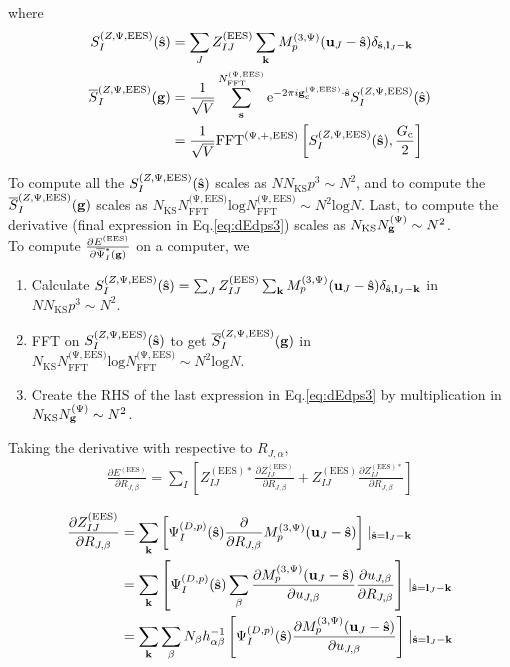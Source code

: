 \documentclass[paper=a4, fontsize=11pt]{article} %
\numberwithin{equation}{section} %
\numberwithin{figure}{section} %
\numberwithin{table}{section} %
\newcommand{\p}{\partial}
\newcommand{\ol}{\overline}
\newcommand{\bu}{{\bf{u}}}
\newcommand{\bl}{{\bf{l}}}
\newcommand{\bk}{{\bf{k}}}
\newcommand{\bs}{{\bf{s}}}
\newcommand{\bg}{{\bf{g}}}
\newcommand{\hs}{{\hat{\bf{s}}}}
\newcommand{\rEES}{{\mathrm{EES}}}
\newcommand{\re}{{\mathrm{e}}}
\newcommand{\rl}{{\mathrm{log}}}
\newcommand{\gcpEES}{{\bg_c^{(\Psi,\rEES)}}}
\newcommand{\al}{{\alpha}}
\newcommand{\sigsc}{{\overline \Psi_I^{*}(\bg)}}
\newcommand{\RJa}{{R_{J,\alpha}}}
\newcommand{\RJb}{{R_{J,\beta}}}
\newcommand{\NFFTpEES}{{N^{\mathrm{(\Psi,\rEES})}_{\mathrm{FFT}}}}
\newcommand{\NgKS}{{N^{\mathrm{(\Psi})}_\bg}}
\newcommand{\hGc}{{\frac{G_{\mathrm{c}}}{2}}}
\newcommand{\Mp}{{M_p^{(3,\Psi)}}}
\newcommand{\FFTpEES}{{\mathrm{FFT}^{(\Psi,+,\rEES)}}}
\begin{document}
where
\begin{equation}
\begin{split}
S^{(Z,\Psi,\rEES)}_I(\hat \bs) &= \sum_J Z_{IJ} ^{(\rEES)} \sum_{\bk} \Mp(\bu_{J}-\hat \bs) \delta_{\hat \bs,\bl_J-\bk}\\
\ol S^{(Z,\Psi,\rEES)}_I(\bg) &= \frac{1}{\sqrt{V}}\sum_{\bs}^\NFFTpEES \re^{-2\pi i\gcpEES \cdot \hat\bs} S^{(Z,\Psi,\rEES)}_I(\hat \bs) \\
&= \frac{1}{\sqrt{V}}\FFTpEES \left[ S^{(Z,\Psi,\rEES)}_I(\hat \bs),\hGc\right]
\end{split}
\end{equation}

To compute all the $S^{(Z,\Psi,\rEES)}_I(\hs)$ scales as $NN_{\mathrm{KS}}p^3 \sim N^2$, and to compute the $\ol S^{(Z,\Psi,\rEES)}_I(\bg)$ scales as $N_{\mathrm{KS}}\NFFTpEES\rl \NFFTpEES\sim N^2 \rl N$. Last, to compute the derivative (final expression in Eq.\eqref{eq:dEdps3}) scales as $N_{\mathrm{KS}}\NgKS \sim N^2$. \\

To compute $\frac{\p E^{(\rEES)}}{\p \sigsc}$ on a computer, we
\begin{enumerate}
\item Calculate $S^{(Z,\Psi,\rEES)}_I(\hs) = \sum_J Z_{IJ} ^{(\rEES)} \sum_{\bk} \Mp(\bu_{J}-\hat \bs) \delta_{\hat \bs,\bl_J-\bk}$ in $NN_{\mathrm{KS}}p^3 \sim N^2$.
\item FFT on $S^{(Z,\Psi,\rEES)}_I(\hs)$ to get $\ol S^{(Z,\Psi,\rEES)}_I(\bg)$ in $N_{\mathrm{KS}}\NFFTpEES\rl \NFFTpEES\sim N^2 \rl N$.
\item Create the RHS of the last expression in Eq.\eqref{eq:dEdps3} by multiplication in $N_{\mathrm{KS}}\NgKS \sim N^2$.
\end{enumerate}


Taking the derivative with respective to $\RJa$,
\begin{equation}\label{eq:dEEESdRs3}
\begin{split}
\frac{\p E^{(\rEES)}}{\p \RJb} = \sum_I\left[ Z_{IJ}^{(\rEES)*} \frac{\p Z_{IJ}^{(\rEES)}}{\p \RJb} + Z_{IJ} ^{(\rEES)}\frac{\p Z^{(\rEES)*}_{IJ}}{\p \RJb}\right]
\end{split}
\end{equation}

\begin{equation} \label{eq:masterdR}
\begin{split}
\frac{\p Z_{IJ}^{(\rEES)}}{\p \RJb}
&= \sum_\bk  \left[\Psi_I^{(D,p)}(\hat \bs) \frac{\p }{\p \RJb}\Mp(\bu_{J}-\hat \bs) \right]\mid_{\hat \bs = \bl_J-\bk} \\
&= \sum_\bk  \left[\Psi_I^{(D,p)}(\hat \bs) \sum_\beta \frac{\p \Mp(\bu_{J}-\hat \bs)}{\p u_{J,\beta}} \frac{\p u_{J,\beta}}{\p \RJb} \right]\mid_{\hat \bs = \bl_J-\bk} \\
&= \sum_\bk \sum_\beta N_\beta h_{\al\beta}^{-1} \left[\Psi_I^{(D,p)}(\hat \bs) \frac{\p \Mp(\bu_{J}-\hat \bs)}{\p u_{J,\beta}} \right]\mid_{\hat \bs = \bl_J-\bk}
\end{split}
\end{equation}
\end{document}
